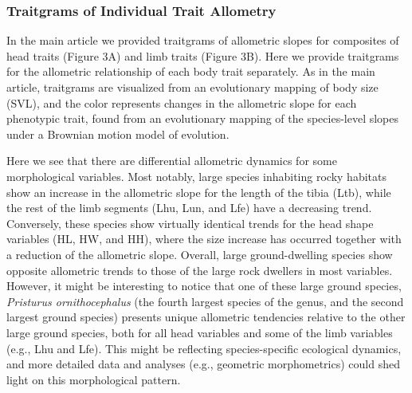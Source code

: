 \documentclass[
  11pt,
]{article}
\begin{document}
\newpage

\hypertarget{traitgrams-of-individual-trait-allometry}{%
\subsubsection{Traitgrams of Individual Trait
Allometry}\label{traitgrams-of-individual-trait-allometry}}

In the main article we provided traitgrams of allometric slopes for
composites of head traits (Figure 3A) and limb traits (Figure 3B). Here
we provide traitgrams for the allometric relationship of each body trait
separately. As in the main article, traitgrams are visualized from an
evolutionary mapping of body size (SVL), and the color represents
changes in the allometric slope for each phenotypic trait, found from an
evolutionary mapping of the species-level slopes under a Brownian motion
model of evolution.

Here we see that there are differential allometric dynamics for some
morphological variables. Most notably, large species inhabiting rocky
habitats show an increase in the allometric slope for the length of the
tibia (Ltb), while the rest of the limb segments (Lhu, Lun, and Lfe)
have a decreasing trend. Conversely, these species show virtually
identical trends for the head shape variables (HL, HW, and HH), where
the size increase has occurred together with a reduction of the
allometric slope. Overall, large ground-dwelling species show opposite
allometric trends to those of the large rock dwellers in most variables.
However, it might be interesting to notice that one of these large
ground species, \emph{Pristurus ornithocephalus} (the fourth largest
species of the genus, and the second largest ground species) presents
unique allometric tendencies relative to the other large ground species,
both for all head variables and some of the limb variables (e.g., Lhu
and Lfe). This might be reflecting species-specific ecological dynamics,
and more detailed data and analyses (e.g., geometric morphometrics)
could shed light on this morphological pattern.
\end{document}
